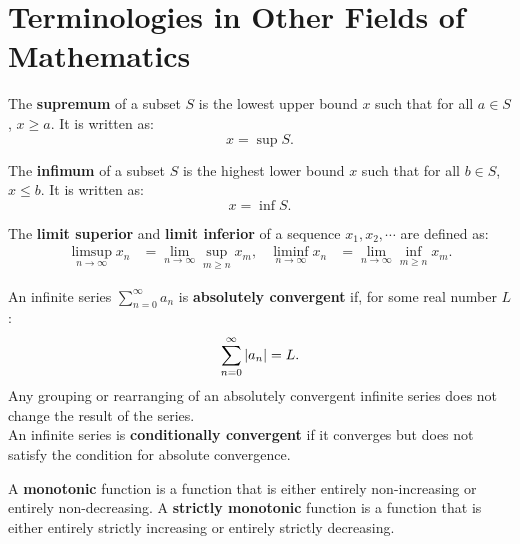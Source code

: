 \documentclass{huhtakm-template-book-v2}
\begin{document}
\chapter{Terminologies in Other Fields of Mathematics}
    \begin{defn}
        The \textbf{supremum} of a subset $S$ is the lowest upper bound $x$ such that for all $a \in S$, $x \geq a$. It is written as:
        \begin{equation*}
            x = \sup S.
        \end{equation*}
    \end{defn}
    \begin{defn}
        The \textbf{infimum} of a subset $S$ is the highest lower bound $x$ such that for all $b \in S$, $x \leq b$. It is written as:
        \begin{equation*}
            x = \inf S.
        \end{equation*}
    \end{defn}
    \begin{defn}
        The \textbf{limit superior} and \textbf{limit inferior} of a sequence $x_{1},x_{2},\cdots$ are defined as:
        \begin{align*}
            \limsup_{n \to \infty}x_{n} &= \lim_{n \to \infty}\sup_{m \geq n}x_{m}, & \liminf_{n \to \infty}x_{n} &=  \lim_{n \to \infty}\inf_{m \geq n}x_{m}.
        \end{align*}
    \end{defn}
    \begin{defn}
        An infinite series $\sum_{n = 0}^{\infty}a_{n}$ is \textbf{absolutely convergent} if, for some real number $L$:
        \begin{equation*}
            \sum_{n = 0}^{\infty}\left|{a_{n}}\right| = L.
        \end{equation*}
        Any grouping or rearranging of an absolutely convergent infinite series does not change the result of the series.\\
        An infinite series is \textbf{conditionally convergent} if it converges but does not satisfy the condition for absolute convergence.
    \end{defn}
    \begin{defn}
        A \textbf{monotonic} function is a function that is either entirely non-increasing or entirely non-decreasing. A \textbf{strictly monotonic} function is a function that is either entirely strictly increasing or entirely strictly decreasing.
    \end{defn}
\end{document}
